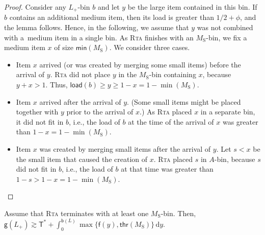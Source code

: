 \documentclass[a4paper,USenglish,cleveref]{lipics-v2019}
\newcommand{\LG}{\ensuremath{L}\xspace}
\newcommand{\M}{\ensuremath{M_\mathrm{S}}\xspace}
\newcommand{\A}{\ensuremath{A}\xspace}
\newcommand{\LT}{\ensuremath{L_+}\xspace}
\newcommand{\smallBoundary}{\ensuremath{\phi}}
\newcommand{\f}{\textsf{f}}
\newcommand{\B}{\textsf{b}}
\newcommand{\gain}{\textsf{g}}
\newcommand{\load}{\textsf{load}}
\newcommand{\thresh}{\textsf{thr}(\M)}
\newcommand{\mn}{\textsf{min}}
\newcommand{\T}{\textsf{T}}
\newcommand{\Tmax}{\T^*}
\newcommand{\dd}{\mathrm{d}}
\newcommand{\ALG}{\textsc{Rta}\xspace}
\begin{document}
\begin{proof}
Consider any \LT-bin $b$ and let $y$ be the large item contained in this bin. 
If $b$ contains an additional medium item, then its load is 
greater than $1/2 + \smallBoundary$, and the lemma follows. Hence, in the following, we assume 
that $y$ was not combined with a~medium item in a single bin. 
As \ALG finishes with an \M-bin, we fix a medium item $x$ of size $\mn(\M)$.
We consider three cases.
%
\begin{itemize}
\item Item $x$ arrived (or was created by merging some small items) before the
arrival of $y$. \ALG did not place $y$ in the $\M$-bin containing $x$,
because $y+x > 1$. Thus, $\load(b) \geq y \geq 1 - x = 1-\min(\M)$.

\item Item $x$ arrived after the arrival of $y$.
(Some small items might be placed together with $y$ prior to the arrival of $x$.)
As \ALG placed $x$ in a separate bin, it did not fit in $b$, i.e., 
the load of $b$ at the time of the arrival of $x$ was greater than $1 - x = 1-\min(\M)$.

\item Item $x$ was created by merging small items after the arrival of $y$.
Let $s < x$ be the small item that caused the creation of $x$. \ALG placed $s$ in \A-bin, because 
$s$ did not fit in $b$, i.e., the load of $b$ at that time
was greater than $1 - s > 1 - x = 1-\min(\M)$.
\qedhere
\end{itemize}
\end{proof}
  


\begin{lemma}
\label{lem:gain-L-minus-T}
Assume that \ALG terminates with at least one $\M$-bin.
Then, $\gain(\LT) \gtrsim \Tmax + \int_0^{\B(\LG)} \max\{ \f(y), \thresh \} \, \dd y$.
\end{lemma}
\end{document}
